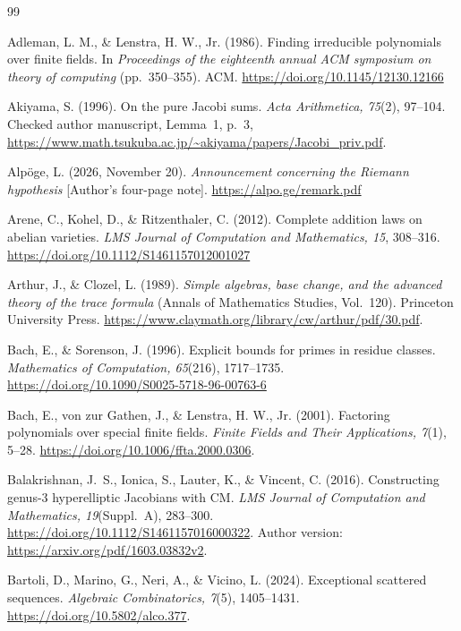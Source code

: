\documentclass[11pt]{article}
\theoremstyle{definition}
\theoremstyle{remark}
\begin{document}
\begin{thebibliography}{99}

Adleman, L. M., \& Lenstra, H. W., Jr. (1986).
Finding irreducible polynomials over finite fields.
In \emph{Proceedings of the eighteenth annual ACM symposium on theory of computing}
(pp.~350--355). ACM. \url{https://doi.org/10.1145/12130.12166}

Akiyama, S. (1996).
On the pure Jacobi sums.
\emph{Acta Arithmetica, 75}(2), 97--104.
Checked author manuscript, Lemma~1, p.~3,
\url{https://www.math.tsukuba.ac.jp/~akiyama/papers/Jacobi_priv.pdf}.

Alp\"oge, L. (2026, November 20).
\emph{Announcement concerning the Riemann hypothesis} [Author's four-page note].
\url{https://alpo.ge/remark.pdf}

Arene, C., Kohel, D., \& Ritzenthaler, C. (2012).
Complete addition laws on abelian varieties.
\emph{LMS Journal of Computation and Mathematics, 15}, 308--316.
\url{https://doi.org/10.1112/S1461157012001027}

Arthur, J., \& Clozel, L. (1989).
\emph{Simple algebras, base change, and the advanced theory of the trace formula}
(Annals of Mathematics Studies, Vol.~120). Princeton University Press.
\url{https://www.claymath.org/library/cw/arthur/pdf/30.pdf}.

Bach, E., \& Sorenson, J. (1996).
Explicit bounds for primes in residue classes.
\emph{Mathematics of Computation, 65}(216), 1717--1735.
\url{https://doi.org/10.1090/S0025-5718-96-00763-6}

Bach, E., von zur Gathen, J., \& Lenstra, H. W., Jr. (2001).
Factoring polynomials over special finite fields.
\emph{Finite Fields and Their Applications, 7}(1), 5--28.
\url{https://doi.org/10.1006/ffta.2000.0306}.

Balakrishnan, J.~S., Ionica, S., Lauter, K., \& Vincent, C. (2016).
Constructing genus-3 hyperelliptic Jacobians with CM.
\emph{LMS Journal of Computation and Mathematics, 19}(Suppl.~A), 283--300.
\url{https://doi.org/10.1112/S1461157016000322}.
Author version: \url{https://arxiv.org/pdf/1603.03832v2}.

Bartoli, D., Marino, G., Neri, A., \& Vicino, L. (2024).
Exceptional scattered sequences.
\emph{Algebraic Combinatorics, 7}(5), 1405--1431.
\url{https://doi.org/10.5802/alco.377}.


\end{thebibliography}
\end{document}
